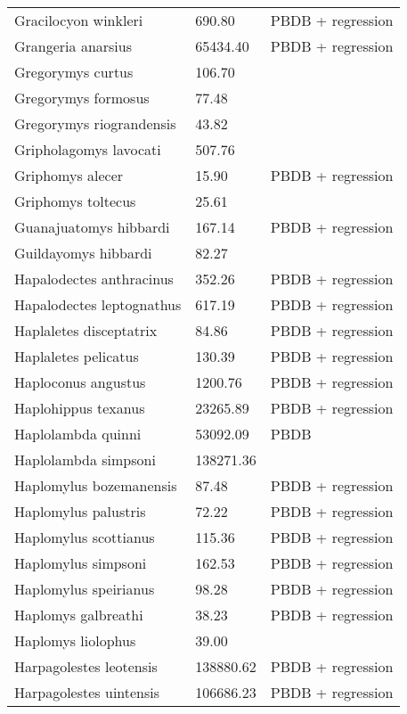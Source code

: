 \documentclass{article}
\begin{document}
\begin{center}
\begin{longtable}{p{} p{} p{} }
  Gracilocyon winkleri & 690.80 & PBDB + regression \\ 
  Grangeria anarsius & 65434.40 & PBDB + regression \\ 
  Gregorymys curtus & 106.70 & \cite{Tomiya2013} \\ 
  Gregorymys formosus & 77.48 & \cite{Tomiya2013} \\ 
  Gregorymys riograndensis & 43.82 & \cite{Tomiya2013} \\ 
  Gripholagomys lavocati & 507.76 & \cite{Tomiya2013} \\ 
  Griphomys alecer & 15.90 & PBDB + regression \\ 
  Griphomys toltecus & 25.61 & \cite{Mihlbachler2006} \\ 
  Guanajuatomys hibbardi & 167.14 & PBDB + regression \\ 
  Guildayomys hibbardi & 82.27 & \cite{Tomiya2013} \\ 
  Hapalodectes anthracinus & 352.26 & PBDB + regression \\ 
  Hapalodectes leptognathus & 617.19 & PBDB + regression \\ 
  Haplaletes disceptatrix & 84.86 & PBDB + regression \\ 
  Haplaletes pelicatus & 130.39 & PBDB + regression \\ 
  Haploconus angustus & 1200.76 & PBDB + regression \\ 
  Haplohippus texanus & 23265.89 & PBDB + regression \\ 
  Haplolambda quinni & 53092.09 & PBDB \\ 
  Haplolambda simpsoni & 138271.36 & \cite{Tedford1994} \\ 
  Haplomylus bozemanensis & 87.48 & PBDB + regression \\ 
  Haplomylus palustris & 72.22 & PBDB + regression \\ 
  Haplomylus scottianus & 115.36 & PBDB + regression \\ 
  Haplomylus simpsoni & 162.53 & PBDB + regression \\ 
  Haplomylus speirianus & 98.28 & PBDB + regression \\ 
  Haplomys galbreathi & 38.23 & PBDB + regression \\ 
  Haplomys liolophus & 39.00 & \cite{McKenna2011} \\ 
  Harpagolestes leotensis & 138880.62 & PBDB + regression \\ 
  Harpagolestes uintensis & 106686.23 & PBDB + regression \\ 

\end{longtable}
\end{center}
\end{document}
